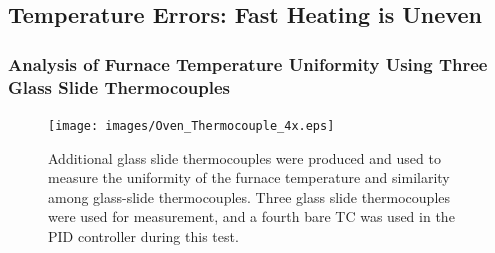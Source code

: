 \documentclass[12pt,oneside,english]{article}
\begin{document}
    
    \subsection{Temperature Errors: Fast Heating is Uneven} \label{sec:Temperature_Uniformity_Three_Slides}

    \subsubsection{Analysis of Furnace Temperature Uniformity Using Three Glass Slide Thermocouples}

    \begin{figure}
    	\texttt{[image: images/Oven\_Thermocouple\_4x.eps]}
    	\caption{Additional glass slide thermocouples were produced and used to measure the uniformity of the furnace temperature and similarity among glass-slide thermocouples.  Three glass slide thermocouples were used for measurement, and a fourth bare TC was used in the PID controller during this test.}
    \end{figure}
\end{document}
